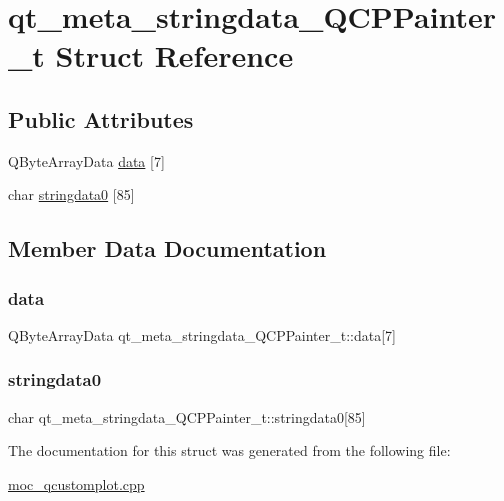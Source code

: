 \hypertarget{structqt__meta__stringdata__QCPPainter__t}{}\section{qt\+\_\+meta\+\_\+stringdata\+\_\+\+Q\+C\+P\+Painter\+\_\+t Struct Reference}
\label{structqt__meta__stringdata__QCPPainter__t}
\subsection*{Public Attributes}
\begin{DoxyCompactItemize}
\item 
Q\+Byte\+Array\+Data \mbox{\hyperlink{structqt__meta__stringdata__QCPPainter__t_ad207c5d12c2c25b489d92c783a387865}{data}} \mbox{[}7\mbox{]}
\item 
char \mbox{\hyperlink{structqt__meta__stringdata__QCPPainter__t_a5a729fecff22f5c3258902008085a51f}{stringdata0}} \mbox{[}85\mbox{]}
\end{DoxyCompactItemize}


\subsection{Member Data Documentation}
\mbox{\label{structqt__meta__stringdata__QCPPainter__t_ad207c5d12c2c25b489d92c783a387865}} 
\subsubsection{\texorpdfstring{data}{data}}
{\footnotesize\ttfamily Q\+Byte\+Array\+Data qt\+\_\+meta\+\_\+stringdata\+\_\+\+Q\+C\+P\+Painter\+\_\+t\+::data\mbox{[}7\mbox{]}}

\mbox{\label{structqt__meta__stringdata__QCPPainter__t_a5a729fecff22f5c3258902008085a51f}} 
\subsubsection{\texorpdfstring{stringdata0}{stringdata0}}
{\footnotesize\ttfamily char qt\+\_\+meta\+\_\+stringdata\+\_\+\+Q\+C\+P\+Painter\+\_\+t\+::stringdata0\mbox{[}85\mbox{]}}



The documentation for this struct was generated from the following file\+:\begin{DoxyCompactItemize}
\item 
\mbox{\hyperlink{moc__qcustomplot_8cpp}{moc\+\_\+qcustomplot.\+cpp}}\end{DoxyCompactItemize}
